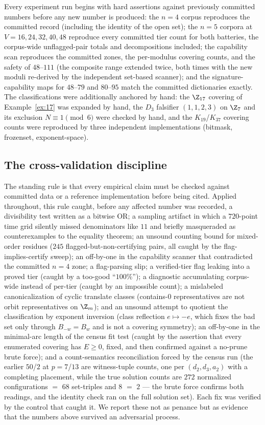 Every experiment run begins with hard assertions against previously
committed numbers before any new number is produced: the $n=4$ corpus
reproduces the committed record (including the identity of the open
set); the $n=5$ corpora at $V=16,24,32,40,48$ reproduce every committed
tier count for both batteries, the corpus-wide unflagged-pair totals and
decompositions included; the capability scan reproduces the committed
zones, the per-modulus covering counts, and the safety of $48$--$111$ (the
composite range extended twice, both times with the new moduli re-derived
by the independent set-based scanner); and the signature-capability maps
for $48$--$79$ and $80$--$95$ match the committed dictionaries exactly. The classifications were additionally anchored by hand: the
$\Z_{17}$ covering of Example~\ref{ex:17} was expanded by hand, the
$D_3$ falsifier $(1,1,2,3)$ on $\Z_7$ and its exclusion
$N\equiv1\pmod6$ were checked by hand, and the $K_{19}$/$K_{37}$
covering counts were reproduced by three independent implementations
(bitmask, frozenset, exponent-space).

\subsection{The cross-validation discipline}

The standing rule is that every empirical claim must be checked against
committed data or a reference implementation before being cited. Applied
throughout, this rule caught, before any affected number was recorded,
a divisibility test written as a
bitwise OR; a sampling artifact in which a $720$-point time grid silently
missed denominators like $11$ and briefly masqueraded as counterexamples
to the equality theorem; an unsound counting bound for mixed-order
residues ($245$ flagged-but-non-certifying pairs, all caught by the
flag-implies-certify sweep); an off-by-one in the capability scanner that
contradicted the committed $n=4$ zone; a flag-parsing slip; a
verified-tier flag leaking into a proved tier (caught by a too-good
``$100\%$''); a diagnostic accumulating corpus-wide instead of
per-tier (caught by an impossible count); a mislabeled canonicalization
of cyclic translate classes (contains-$0$ representatives are not orbit
representatives on $\Z_m$); and an unsound attempt to quotient the
classification by exponent inversion (class reflection $e\mapsto-e$,
which fixes the bad set only through $B_{-w}=B_w$ and is not a covering
symmetry); an off-by-one in the minimal-arc length of the census fit test (caught by
the assertion that every enumerated covering has $E\ge0$, fixed, and then
confirmed against a no-prune brute force); and a count-semantics
reconciliation forced by the census run (the earlier $50$/$2$ at
$p=7$/$13$ are witness-tuple counts, one per $(d_2,d_3,a_2)$ with a
completing placement, while the true solution counts are $272$
normalized configurations $=$ $68$ set-triples and $8$ $=$ $2$ --- the
brute force confirms both readings, and the identity check ran on the full
solution set).
Each fix was verified by the control that caught it. We report these not
as penance but as evidence that the numbers above survived an adversarial
process.

